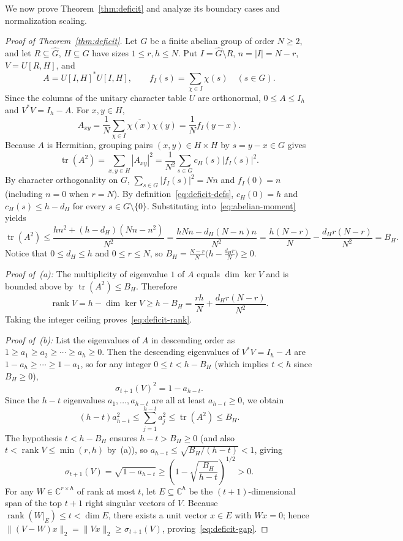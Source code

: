 \documentclass[11pt,reqno]{amsart}
\numberwithin{equation}{section}
\theoremstyle{definition}
\theoremstyle{remark}
\newcommand{\C}{\mathbb{C}}
\newcommand{\rank}{\operatorname{rank}}
\newcommand{\tr}{\operatorname{tr}}
\begin{document}
We now prove Theorem~\ref{thm:deficit} and analyze its boundary cases and normalization scaling.

\begin{proof}[Proof of Theorem~\ref{thm:deficit}]
Let $G$ be a finite abelian group of order $N\ge 2$, and let $R\subseteq\widehat{G}$, $H\subseteq G$ have sizes $1\le r,h\le N$. Put $I = \widehat{G}\setminus R$, $n = |I| = N - r$, $V = U[R,H]$, and
\[
A = U[I,H]^* U[I,H],\qquad f_I(s) = \sum_{\chi\in I}\chi(s)\quad (s\in G).
\]
Since the columns of the unitary character table $U$ are orthonormal, $0\le A\le I_h$ and $V^*V = I_h - A$. For $x,y\in H$,
\[
A_{xy} = \frac{1}{N}\sum_{\chi\in I}\overline{\chi(x)}\chi(y) = \frac{1}{N}f_I(y-x).
\]
Because $A$ is Hermitian, grouping pairs $(x,y)\in H\times H$ by $s=y-x\in G$ gives
\begin{equation}
\label{eq:abelian-moment}
\tr(A^2) = \sum_{x,y\in H}|A_{xy}|^2 = \frac{1}{N^2}\sum_{s\in G} c_H(s)|f_I(s)|^2.
\end{equation}
By character orthogonality on $G$, $\sum_{s\in G}|f_I(s)|^2 = Nn$ and $f_I(0) = n$ (including $n=0$ when $r=N$). By definition~\eqref{eq:deficit-defs}, $c_H(0)=h$ and $c_H(s)\le h - d_H$ for every $s\in G\setminus\{0\}$. Substituting into~\eqref{eq:abelian-moment} yields
\begin{equation}
\label{eq:BH-proof}
\tr(A^2)
\le \frac{h n^2 + (h - d_H)(Nn - n^2)}{N^2}
= \frac{hNn - d_H(N-n)n}{N^2}
= \frac{h(N-r)}{N} - \frac{d_H r(N-r)}{N^2} = B_H.
\end{equation}
Notice that $0\le d_H\le h$ and $0\le r\le N$, so $B_H = \frac{N-r}{N}\bigl(h - \frac{d_H r}{N}\bigr) \ge 0$.

\smallskip
\noindent\emph{Proof of~(a):} The multiplicity of eigenvalue $1$ of $A$ equals $\dim\ker V$ and is bounded above by $\tr(A^2)\le B_H$. Therefore
\[
\rank V = h - \dim\ker V \ge h - B_H = \frac{rh}{N} + \frac{d_H r(N-r)}{N^2}.
\]
Taking the integer ceiling proves~\eqref{eq:deficit-rank}.

\smallskip
\noindent\emph{Proof of~(b):} List the eigenvalues of $A$ in descending order as $1\ge a_1\ge a_2\ge \cdots\ge a_h\ge 0$. Then the descending eigenvalues of $V^*V = I_h - A$ are $1-a_h \ge \cdots \ge 1-a_1$, so for any integer $0\le t < h - B_H$ (which implies $t<h$ since $B_H\ge 0$),
\[
\sigma_{t+1}(V)^2 = 1 - a_{h-t}.
\]
Since the $h-t$ eigenvalues $a_1,\ldots,a_{h-t}$ are all at least $a_{h-t}\ge 0$, we obtain
\[
(h - t) a_{h-t}^2 \le \sum_{j=1}^{h-t} a_j^2 \le \tr(A^2) \le B_H.
\]
The hypothesis $t < h - B_H$ ensures $h - t > B_H \ge 0$ (and also $t < \rank V \le \min(r,h)$ by~(a)), so $a_{h-t} \le \sqrt{B_H/(h-t)} < 1$, giving
\[
\sigma_{t+1}(V) = \sqrt{1 - a_{h-t}} \ge \left(1 - \sqrt{\frac{B_H}{h - t}}\right)^{1/2} > 0.
\]
For any $W\in\C^{r\times h}$ of rank at most $t$, let $E\subseteq\C^h$ be the $(t+1)$-dimensional span of the top $t+1$ right singular vectors of $V$. Because $\rank(W|_E)\le t < \dim E$, there exists a unit vector $x\in E$ with $Wx=0$; hence $\|(V-W)x\|_2 = \|Vx\|_2 \ge \sigma_{t+1}(V)$, proving~\eqref{eq:deficit-gap}.


\end{proof}
\end{document}

